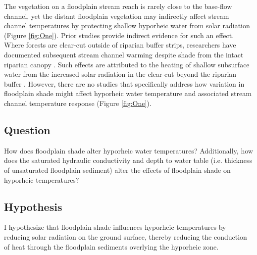 \documentclass[a4paper]{article}
\begin{document}
The vegetation on a floodplain stream reach is rarely close to the base-flow channel, yet the distant floodplain vegetation may indirectly affect stream channel temperatures by protecting shallow hyporheic water from solar radiation (Figure \ref{fig:One}). Prior studies provide indirect evidence for such an effect. Where forests are clear-cut outside of riparian buffer strips, researchers have documented subsequent stream channel warming despite shade from the intact riparian canopy \parencite{Moore2005RiparianReview, Cole2013InfluenceOregon}. Such effects are attributed to the heating of shallow subsurface water from the increased solar radiation in the clear-cut beyond the riparian buffer \parencite{Moore2005RiparianReview, Brosofske1997HarvestingWashington}. However, there are no studies that specifically address how variation in floodplain shade might affect hyporheic water temperature and associated stream channel temperature response (Figure \ref{fig:One}). 



\subsection*{Question}
How does floodplain shade alter hyporheic water temperatures? Additionally, how does the saturated hydraulic conductivity and depth to water table (i.e. thickness of unsaturated floodplain sediment) alter the effects of floodplain shade on hyporheic temperatures?


\subsection*{Hypothesis}
I hypothesize that floodplain shade influences hyporheic temperatures by reducing solar radiation on the ground surface, thereby reducing the conduction of heat through the floodplain sediments overlying the hyporheic zone.

\end{document}
